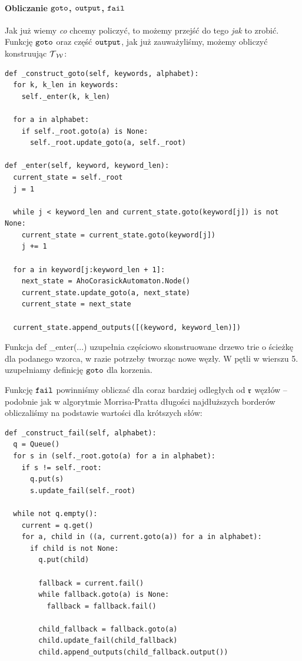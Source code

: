 \paragraph{Obliczanie $\operatorname{\texttt{goto}}$, $\operatorname{\texttt{output}}$, $\operatorname{\texttt{fail}}$}
Jak już wiemy \textit{co} chcemy policzyć, to możemy przejść do tego \textit{jak} to zrobić. Funkcję $\operatorname{\texttt{goto}}$ oraz część $\operatorname{\texttt{output}}$, jak już zauważyliśmy, możemy obliczyć konstruując $\operatorname{\mathcal{T}}_{\operatorname{\mathcal{W}}}$:
\begin{verbatim}
def _construct_goto(self, keywords, alphabet):
  for k, k_len in keywords:
    self._enter(k, k_len)

  for a in alphabet:
    if self._root.goto(a) is None:
      self._root.update_goto(a, self._root)

def _enter(self, keyword, keyword_len):
  current_state = self._root
  j = 1

  while j < keyword_len and current_state.goto(keyword[j]) is not None:
    current_state = current_state.goto(keyword[j])
    j += 1

  for a in keyword[j:keyword_len + 1]:
    next_state = AhoCorasickAutomaton.Node()
    current_state.update_goto(a, next_state)
    current_state = next_state

  current_state.append_outputs([(keyword, keyword_len)])
\end{verbatim}

Funkcja def \_enter(...) uzupełnia częściowo skonstruowane drzewo trie o ścieżkę dla podanego wzorca, w razie potrzeby tworząc nowe węzły. W pętli w wierszu 5. uzupełniamy definicję $\operatorname{\texttt{goto}}$ dla korzenia.

\vspace{10pt}

Funkcję $\operatorname{\texttt{fail}}$ powinniśmy obliczać dla coraz bardziej odległych od $\operatorname{\mathfrak{r}}$ węzłów -- podobnie jak w algorytmie Morrisa-Pratta długości najdłuższych borderów obliczaliśmy na podstawie wartości dla krótszych słów:

\begin{verbatim}
def _construct_fail(self, alphabet):
  q = Queue()
  for s in (self._root.goto(a) for a in alphabet):
    if s != self._root:
      q.put(s)
      s.update_fail(self._root)

  while not q.empty():
    current = q.get()
    for a, child in ((a, current.goto(a)) for a in alphabet):
      if child is not None:
        q.put(child)

        fallback = current.fail()
        while fallback.goto(a) is None:
          fallback = fallback.fail()

        child_fallback = fallback.goto(a)
        child.update_fail(child_fallback)
        child.append_outputs(child_fallback.output())
\end{verbatim}

